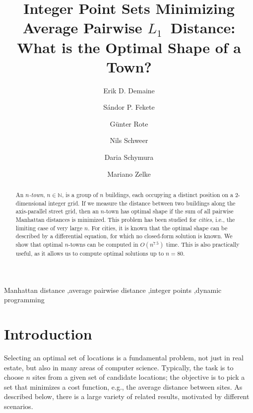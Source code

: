 \documentclass[preprint,authoryear,12pt]{elsarticle}
\begin{document}
\begin{frontmatter}





\title{Integer Point Sets Minimizing Average Pairwise
  $L_1$~Distance:
What is the Optimal Shape of a Town?}



\author[MIT]{Erik D. Demaine}
\author[TUBS]{S\'andor P. Fekete}
\author[FUB]{G\"{u}nter Rote}
\author[TUBS]{Nils Schweer}
\author[FUB]{\hspace{.45cm}Daria Schymura}
\author[GUF]{Mariano Zelke}

\address[MIT]{Computer Science and Artificial Intelligence Lab, MIT, USA.}
\address[TUBS]{Algorithms Group, Braunschweig University of Technology, Germany.}
\address[FUB]{Institut f\"ur Informatik, Freie Universit\" at Berlin, Germany.}
\address[GUF]{Institut f\"ur Informatik, Goethe-Universit\"at, Frankfurt am Main, Germany.}


\begin{abstract}
An {\em $n$-town}, $n\in \mathbb{N}$, is a group of $n$ buildings,
each occupying a distinct position on a 2-dimensional integer grid.
If we measure the distance between two buildings along the
axis-parallel street grid, then an $n$-town has optimal shape if the
sum of all pairwise Manhattan distances is minimized. This problem
has been studied for {\em cities}, i.e., the limiting case of very
large $n$. For cities, it is known that the optimal shape can be
described by a differential equation, for which no closed-form
solution
is known. We show that optimal $n$-towns
can be computed in $O(n^{7.5})$ time. This is also practically
useful,
as it allows us to compute optimal solutions up to $n=80$. \end{abstract}

\begin{keyword}
Manhattan distance \sep average pairwise distance \sep integer
points \sep dynamic programming
\end{keyword}

\end{frontmatter}







\section{Introduction}\label{sec:introduction}
Selecting an optimal set of locations is a fundamental problem, not
just in real estate, but also in many areas of computer science.
Typically, the task is to choose $n$ sites from a given set
of candidate locations; the objective is to pick a set that minimizes
a cost function, e.g., the average distance
between sites. As described below, there is a large variety of related results,
motivated by different scenarios.
\end{document}
